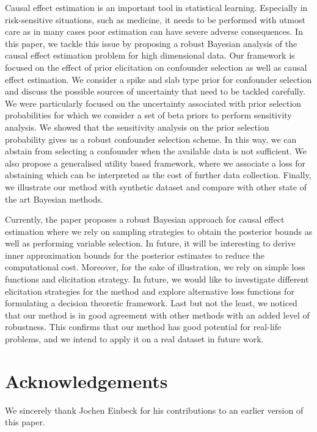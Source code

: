 \documentclass[preprint,12pt]{elsarticle}
\begin{document}
Causal effect estimation is an important tool in statistical learning.
Especially in risk-sensitive situations, such as medicine, it needs to
be performed with utmost care as in many cases poor estimation can have severe adverse consequences.
In this paper, we tackle this issue by proposing a robust Bayesian analysis of the causal 
effect estimation problem for high dimensional data. Our 
framework is focused on the effect of prior elicitation on
confounder selection
as well as causal effect estimation. We consider a spike and slab type
prior for confounder selection and discuss the possible sources of uncertainty that
need to be tackled carefully. We were particularly focused on the uncertainty associated
with prior selection probabilities for which we consider a set of beta priors to perform
sensitivity analysis. We showed that the sensitivity analysis on the prior selection probability
gives us a robust confounder selection scheme. In this way, we can abstain from selecting
a confounder when the available data is not sufficient. We also propose a generalised
utility based framework, where we associate a loss for abstaining which can be interpreted 
as the cost of further data collection. Finally, we illustrate our method with synthetic dataset
and compare with other state of the art Bayesian methods. 


Currently, the paper proposes a robust Bayesian approach for causal effect estimation where
we rely on sampling strategies to obtain the posterior bounds as well as performing 
variable selection. In future, it will be interesting to derive inner approximation bounds
for the posterior estimates to reduce the computational cost. Moreover, for the sake of
illustration, we rely on simple loss functions and elicitation strategy. In future, we would
like to investigate different elicitation strategies for the method and explore alternative 
loss functions for formulating a decision theoretic framework. Last but not the least,
we noticed that our method
is in good agreement with other methods with an added level of robustness.
This confirms that our method has good potential for real-life problems,
and we intend to apply it on a real dataset in future work.

\section*{Acknowledgements}

We sincerely thank Jochen Einbeck for his contributions to an earlier version of this paper.

 

\end{document}
